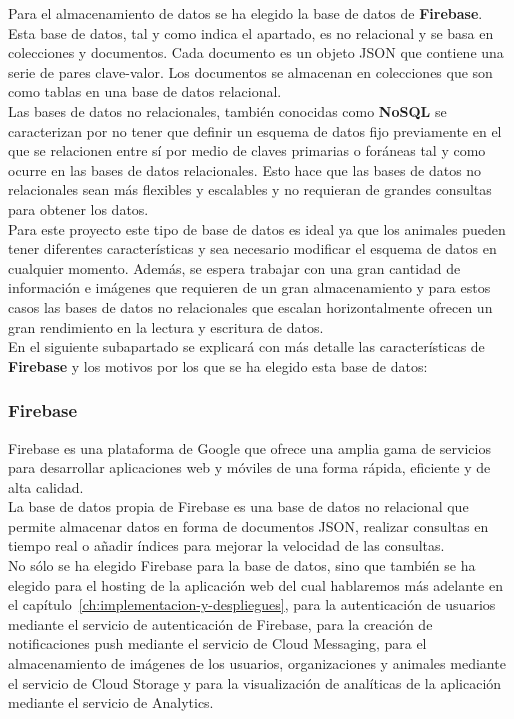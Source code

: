 Para el almacenamiento de datos se ha elegido la base de datos de \textbf{Firebase}. Esta base de datos, tal y como
indica el apartado, es no relacional y se basa en colecciones y documentos. Cada documento es un objeto JSON que
contiene una serie de pares clave-valor. Los documentos se almacenan en colecciones que son como tablas en una base de datos
relacional. \\

Las bases de datos no relacionales, también conocidas como \textbf{NoSQL} se caracterizan por no tener que definir un
esquema de datos fijo previamente en el que se relacionen entre sí por medio de claves primarias o foráneas tal y
como ocurre en las bases de datos relacionales. Esto hace que las bases de datos no relacionales sean más flexibles
y escalables y no requieran de grandes consultas para obtener los datos. \\

Para este proyecto este tipo de base de datos es ideal ya que los animales pueden tener diferentes características
y sea necesario modificar el esquema de datos en cualquier momento. Además, se espera trabajar con una gran cantidad
de información e imágenes que requieren de un gran almacenamiento y para estos casos las bases de datos no relacionales
que escalan horizontalmente ofrecen un gran rendimiento en la lectura y escritura de datos. \\

En el siguiente subapartado se explicará con más detalle las características de \textbf{Firebase} y los motivos por
los que se ha elegido esta base de datos:

\subsubsection{Firebase}\label{subsubsec:firebase}
Firebase es una plataforma de Google que ofrece una amplia gama de servicios
para desarrollar aplicaciones web y móviles de una forma rápida, eficiente y de alta calidad. \\

La base de datos propia de Firebase es una base de datos no relacional que permite almacenar datos en forma de documentos JSON,
realizar consultas en tiempo real o añadir índices para mejorar la velocidad de las consultas. \\

No sólo se ha elegido Firebase para la base de datos, sino que también se ha elegido para el hosting de la
aplicación web del cual hablaremos más adelante en el capítulo~\ref{ch:implementacion-y-despliegues}, para la
autenticación de usuarios mediante el servicio de autenticación de Firebase, para la creación de notificaciones
push mediante el servicio de Cloud Messaging, para el almacenamiento de imágenes de los usuarios, organizaciones
y animales mediante el servicio de Cloud Storage y para la visualización de analíticas de la aplicación mediante
el servicio de Analytics. \\

